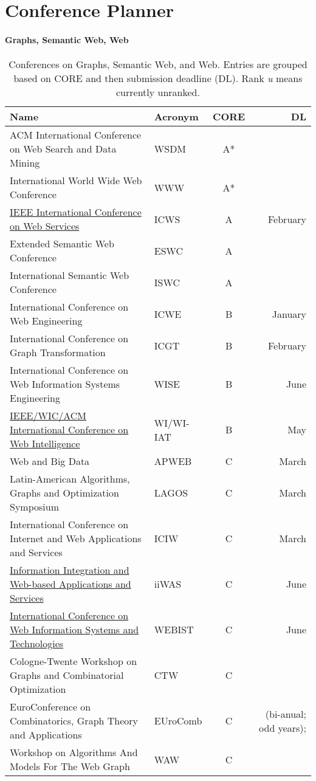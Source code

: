 
\section{Conference Planner}

\paragraph{Graphs, Semantic Web, Web}

\begin{table}[h]
    \caption{Conferences on Graphs, Semantic Web, and Web. Entries are grouped 
    based on CORE and then submission deadline (DL). Rank \textit{u} means currently unranked.}
    \label{tab:conferences:graphs}

    \centering
    \begin{tabular}{|l|l|c|r|}
    \toprule
         Name & Acronym & CORE & DL  \\
\hline
ACM International Conference on Web Search and Data Mining & WSDM & A* & \\
International World Wide Web Conference  & WWW & A* & \\ 	

\hline
\hyperlink{https://conferences.computer.org/icws/}{IEEE International Conference on Web Services} & ICWS & A & February \\
Extended Semantic Web Conference & ESWC & A & \\ 	
International Semantic Web Conference & ISWC & A & \\ 	

\hline
International Conference on Web Engineering & ICWE & B & January \\
International Conference on Graph Transformation & ICGT & B & February \\ 
International Conference on Web Information Systems Engineering & WISE & B & June \\
\hyperlink{https://www.wi-iat.com/}{IEEE/WIC/ACM International Conference on Web Intelligence} & WI/WI-IAT & B & May \\ 	

\hline
Web and Big Data & APWEB & C & March \\
Latin-American Algorithms, Graphs and Optimization Symposium & LAGOS & C & March \\
International Conference on Internet and Web Applications and Services & ICIW & C & March \\
\hyperlink{https://www.iiwas.org/}{Information Integration and Web-based Applications and Services} &  	iiWAS & C & June \\	
\hyperlink{https://webist.scitevents.org/}{International Conference on Web Information Systems and Technologies} & WEBIST & C & June \\
Cologne-Twente Workshop on Graphs and Combinatorial Optimization & CTW & C & \\
EuroConference on Combinatorics, Graph Theory and Applications & EUroComb & C & (bi-anual; odd years); \\
Workshop on Algorithms And Models For The Web Graph & WAW & C & \\


\end{tabular}
\end{table}
